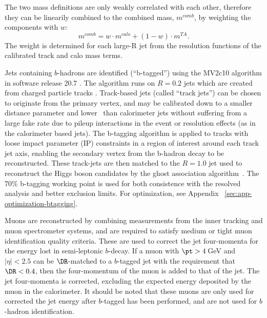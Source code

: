 The two mass definitions are only weakly correlated with each other, therefore they can be linearily combined to the combined mass, $m^{comb}$, by weighting the components with $w$:
\begin{equation}
m^{comb} = w\cdot m^{calo}+(1-w)\cdot m^{TA}.
\end{equation}
The weight is determined for each large-R jet from the resolution functions of the calibrated track and calo mass terms.

Jets containing $b$-hadrons are identified (``b-tagged'') using the MV2c10 algorithm in software release 20.7 \cite{ATL-PHYS-PUB-2015-022}. The algorithm runs on \akt $R=0.2$ jets which are created from charged particle tracks \cite{ATL-PHYS-PUB-2014-013,ATL-PHYS-PUB-2015-035}. Track-based jets (called ``track jets'') can be chosen to originate from the primary vertex, and may be calibrated down to a smaller distance parameter and lower \pt\ than calorimeter jets without suffering from a large fake rate due to pileup interactions in the event or resolution effects (as in the calorimeter based jets). The b-tagging algorithm is applied to tracks with loose impact parameter (IP) constraints in a region of interest around each track jet axis, enabling the secondary vertex from the b-hadron decay to be reconstructed. These track-jets are then matched to the $R=1.0$ jet used to reconstruct the Higgs boson candidates by the ghost association algorithm~\cite{Cacciari:2007fd}. The 70\% b-tagging working point is used for both consistence with the resolved analysis and better exclusion limits. For optimization, see Appendix ~\ref{sec:app-optimization-btagging}.

Muons are reconstructed by combining measurements from the inner tracking and muon spectrometer systems, and are required to satisfy medium or tight muon identification quality criteria. %
These are used to correct the jet four-momenta for the energy lost in semi-leptonic $b$-decay. If a muon with $\pt > 4$\,GeV and $|\eta | < 2.5$ can be $\DR$-matched to a $b$-tagged jet with the requirement that $\DR < 0.4$, then the four-momentum of the muon is added to that of the jet. The jet four-momenta is corrected, excluding the expected energy deposited by the muon in the calorimeter. It should be noted that these muons are only used for corrected the jet energy after $b$-tagged has been performed, and are not used for $b$-hadron identification.

